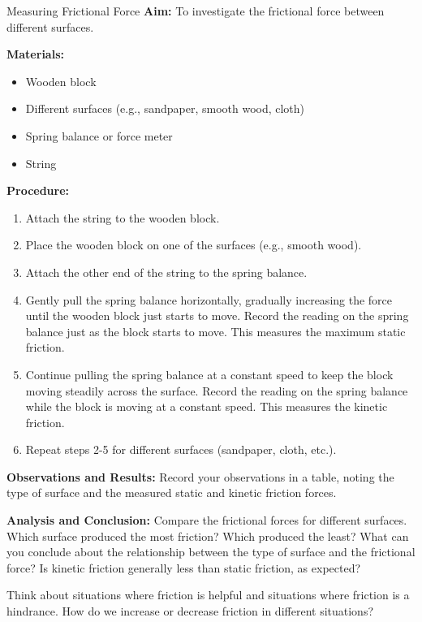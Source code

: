 \begin{investigation}{Measuring Frictional Force}
\textbf{Aim:} To investigate the frictional force between different surfaces.

\textbf{Materials:}
\begin{itemize}
    \item Wooden block
    \item Different surfaces (e.g., sandpaper, smooth wood, cloth)
    \item Spring balance or force meter
    \item String
\end{itemize}

\textbf{Procedure:}
\begin{enumerate}
    \item Attach the string to the wooden block.
    \item Place the wooden block on one of the surfaces (e.g., smooth wood).
    \item Attach the other end of the string to the spring balance.
    \item Gently pull the spring balance horizontally, gradually increasing the force until the wooden block just starts to move.  Record the reading on the spring balance just as the block starts to move. This measures the maximum static friction.
    \item Continue pulling the spring balance at a constant speed to keep the block moving steadily across the surface.  Record the reading on the spring balance while the block is moving at a constant speed. This measures the kinetic friction.
    \item Repeat steps 2-5 for different surfaces (sandpaper, cloth, etc.).
\end{enumerate}

\textbf{Observations and Results:}
Record your observations in a table, noting the type of surface and the measured static and kinetic friction forces.

\textbf{Analysis and Conclusion:}
Compare the frictional forces for different surfaces.  Which surface produced the most friction? Which produced the least?  What can you conclude about the relationship between the type of surface and the frictional force?  Is kinetic friction generally less than static friction, as expected?

\end{investigation}

\begin{stopandthink}
Think about situations where friction is helpful and situations where friction is a hindrance.  How do we increase or decrease friction in different situations?
\end{stopandthink}

